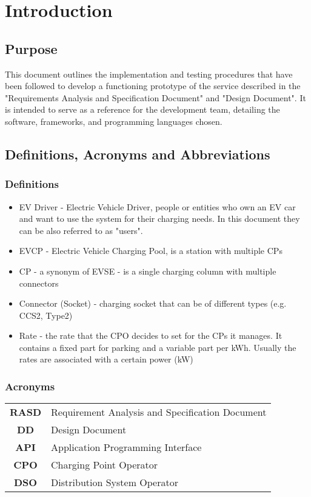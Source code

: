 \section{Introduction}
\subsection{Purpose}
This document outlines the implementation and testing procedures that have been followed to develop a functioning prototype of the service described in the "Requirements Analysis and Specification Document" and "Design Document".
It is intended to serve as a reference for the development team, detailing the software, frameworks, and programming languages chosen.
\subsection{Definitions, Acronyms and Abbreviations}

\subsubsection{Definitions}
\begin{itemize}
    \item EV Driver - Electric Vehicle Driver, people or entities who own an EV car and want to use the
          system for their charging needs. In this document they can be also referred to as "users".
    \item EVCP - Electric Vehicle Charging Pool, is a station with multiple CPs
    \item CP - a synonym of EVSE - is a single charging column with multiple connectors
    \item Connector (Socket) - charging socket that can be of different types (e.g. CCS2, Type2)
    \item Rate - the rate that the CPO decides to set for the CPs it manages. It contains a fixed part for
          parking and a variable part per kWh. Usually the rates are associated with a certain power (kW)
\end{itemize}

\subsubsection{Acronyms}
\begin{table}[H]
    \begin{tabularx}{\textwidth}{cX}
        \toprule
        \textbf{RASD} & Requirement Analysis and Specification Document \\
        \textbf{DD}   & Design Document                                 \\
        \textbf{API}  & Application Programming Interface               \\
        \textbf{CPO}  & Charging Point Operator                         \\
        \textbf{DSO}  & Distribution System Operator                    \\
        \bottomrule
    \end{tabularx}
\end{table}
